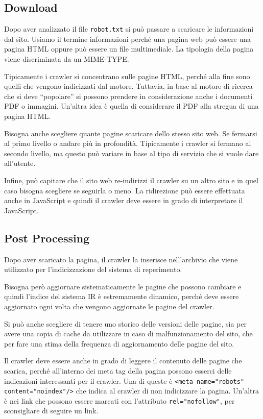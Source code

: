 \subsection{Download}

Dopo aver analizzato il file \texttt{robot.txt} si può passare a scaricare le informazioni dal sito.
Usiamo il termine informazioni perché una pagina web può essere una pagina HTML oppure può essere un file multimediale.
La tipologia della pagina viene discriminata da un MIME-TYPE.

Tipicamente i crawler si concentrano sulle pagine HTML, perché alla fine sono quelli che vengono indicizzati dal motore. Tuttavia, in base al motore di ricerca che si deve ``popolare'' si possono prendere in considerazione anche i documenti PDF o immagini.
Un'altra idea è quella di considerare il PDF alla stregua di una pagina HTML.

Bisogna anche scegliere quante pagine scaricare dello stesso sito web. Se fermarsi al primo livello o andare più in profondità. Tipicamente i crawler si fermano al secondo livello, ma questo può variare in base al tipo di servizio che si vuole dare all'utente.

Infine, può capitare che il sito web re-indirizzi il crawler su un altro sito e in quel caso bisogna scegliere se seguirla o meno. La ridirezione può essere effettuata anche in JavaScript e quindi il crawler deve essere in grado di interpretare il JavaScript.

\subsection{Post Processing}

Dopo aver scaricato la pagina, il crawler la inserisce nell'archivio che viene utilizzato per l'indicizzazione del sistema di reperimento.

Bisogna però aggiornare sistematicamente le pagine che possono cambiare e quindi l'indice del sistema IR è estremamente dinamico, perché deve essere aggiornato ogni volta che vengono aggiornate le pagine del crawler.

Si può anche scegliere di tenere uno storico delle versioni delle pagine, sia per avere una copia di cache da utilizzare in caso di malfunzionamento del sito, che per fare una stima della frequenza di aggiornamento delle pagine del sito.

Il crawler deve essere anche in grado di leggere il contenuto delle pagine che scarica, perché all'interno dei meta tag della pagina possono esserci delle indicazioni interessanti per il crawler. Una di queste è \texttt{<meta name="robots" content="noindex"/>} che indica al crawler di non indicizzare la pagina. Un'altra è nei link che possono essere marcati con l'attributo \texttt{rel="nofollow"}, per sconsigliare di seguire un link.

